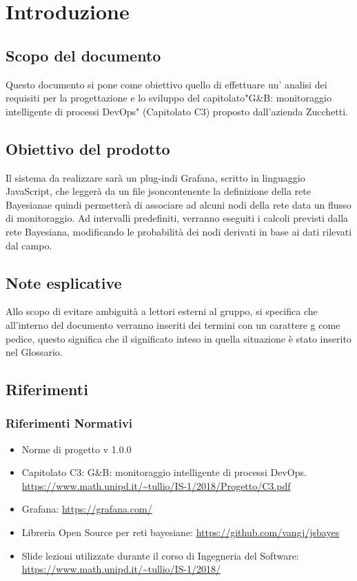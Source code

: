 \section{Introduzione}
		\subsection{Scopo del documento}			
Questo documento si pone come obiettivo quello di effettuare un' analisi dei requisiti per la progettazione e lo sviluppo del capitolato\pedice "G\&B: monitoraggio intelligente di processi DevOps\pedice" (Capitolato C3) proposto dall'azienda Zucchetti\pedice.


		\subsection{Obiettivo del prodotto}

Il sistema da realizzare sarà  un plug-in\pedice di Grafana\pedice, scritto in linguaggio JavaScript\pedice, che leggerà da un file json\pedice contenente la definizione della rete Bayesiana\pedice e quindi permetterà di associare ad alcuni nodi della rete data un flusso di monitoraggio\pedice.
Ad intervalli predefiniti, verranno eseguiti i calcoli previsti dalla rete Bayesiana, modificando le probabilità dei nodi derivati in base ai dati rilevati dal campo.


		\subsection{Note esplicative}

Allo scopo di evitare ambiguità a lettori esterni al gruppo, si specifica che all'interno del documento verranno inseriti dei termini con un carattere g come pedice, questo significa che il significato inteso in quella situazione è stato inserito nel Glossario.


		\subsection{Riferimenti }

		\subsubsection{Riferimenti Normativi}
		\begin{itemize}
			\item Norme di progetto v 1.0.0
			\item Capitolato C3: G\&B: monitoraggio intelligente di processi DevOps.\newline
			\url{https://www.math.unipd.it/~tullio/IS-1/2018/Progetto/C3.pdf}
			\item Grafana:\newline
			\url{https://grafana.com/}
			\item Libreria Open Source per reti bayesiane:\newline
			\url{https://github.com/vangj/jsbayes}
			\item Slide lezioni utilizzate durante il corso di Ingegneria del Software:\newline
			\url{https://www.math.unipd.it/~tullio/IS-1/2018/}
		\end{itemize}

